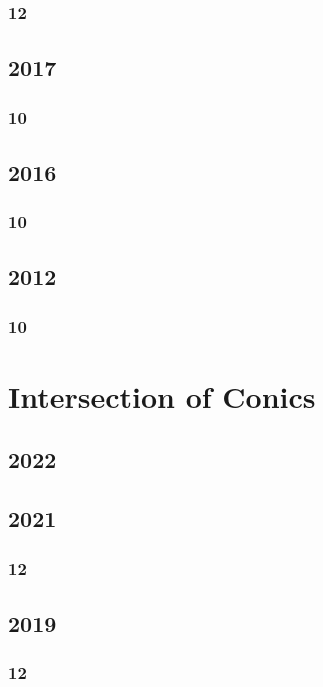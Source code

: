 \documentclass[11pt]{book}
\begin{document}
\subsection{12}

\section{2017}
\subsection{10}




\section{2016}
\subsection{10}

\section{2012}
\subsection{10}




\chapter{Intersection of Conics}
\section{2022}

\section{2021}
\subsection{12}

\section{2019}
\subsection{12}


\end{document}

